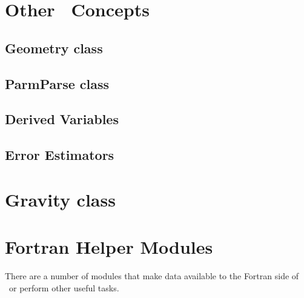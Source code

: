 \section{Other \boxlib\ Concepts}

\subsection{Geometry class}

\subsection{ParmParse class}

\subsection{Derived Variables}

\subsection{Error Estimators}


\section{Gravity class}


\section{Fortran Helper Modules}

There are a number of modules that make data available to the Fortran
side of \castro\ or perform other useful tasks.


